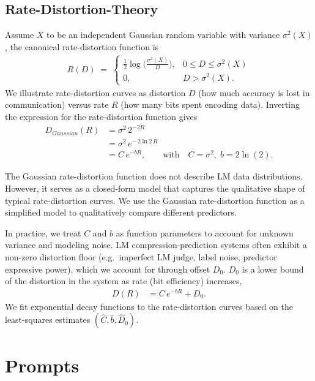 \documentclass{article} %
\begin{document}
\subsection{Rate-Distortion-Theory}
\label{sec:appendix-rate-distortion}

Assume $X$ to be an independent Gaussian random variable with variance $\sigma^{2}(X)$, the canonical rate-distortion function is 
\begin{align*}
    R(D) \;=\; \begin{cases}
\displaystyle \tfrac{1}{2}\log\bigl( \tfrac{\sigma^{2}(X)}{D} \bigr), & 0 \le D \le \sigma^{2}(X)\\[6pt]
0, & D > \sigma^{2}(X).
\end{cases}
\end{align*}
We illustrate rate-distortion curves as distortion \(D\) (how much accuracy is lost in communication) versus rate \(R\) (how many bits spent encoding data). Inverting the expression for the rate-distortion function gives \citep{wiley2005ratedistortion}
\begin{align*}
    D_{Gaussian}(R) &= \sigma^{2}\,2^{-2R} \\
         &= \sigma^{2}\,e^{-\,2\ln 2\,R} \\
         &= C\,e^{-bR}, \qquad\text{with}\quad
C=\sigma^{2},\; b=2\ln(2).
\end{align*}

The Gaussian rate-distortion function does not describe LM data distributions. However, it serves as a closed-form model that captures the qualitative shape of typical rate-distortion curves. We use the Gaussian rate-distortion function as a simplified model to qualitatively compare different predictors. 

In practice, we treat \(C\) and $b$ as function parameters to account for unknown variance and modeling noise. LM compression-prediction systems often exhibit a non-zero distortion floor (e.g.\ imperfect LM judge, label noise, predictor expressive power), which we account for through offset \(D_{0}\). \(D_{0}\) is a lower bound of the distortion in the system as rate (bit efficiency) increases,
\begin{align*}
    D(R) &= C\,e^{-b R} + D_0.
\end{align*}
We fit exponential decay functions to the rate-distortion curves based on the least-squares estimates \((\hat C,\hat{b},\hat D_{0})\).

\section{Prompts}
\label{sec:appendix-prompts}
\end{document}
